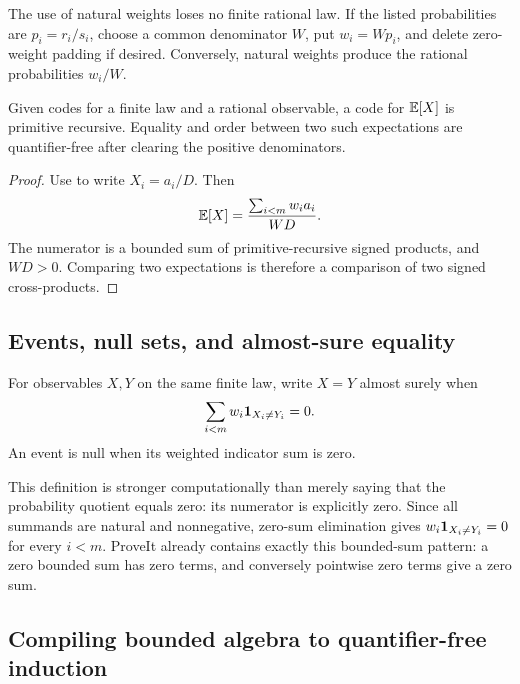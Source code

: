 The use of natural weights loses no finite rational law.  If the listed
probabilities are \(p_i=r_i/s_i\), choose a common denominator \(W\), put
\(w_i=Wp_i\), and delete zero-weight padding if desired.  Conversely, natural
weights produce the rational probabilities \(w_i/W\).

\begin{lemma}\label{lem:pr-evaluator}
Given codes for a finite law and a rational observable, a code for
\(\mathbb E[X]\) is primitive recursive.  Equality and order between two such
expectations are quantifier-free after clearing the positive denominators.
\end{lemma}

\begin{proof}
Use  to write \(X_i=a_i/D\).  Then
\[
 \mathbb E[X]=\frac{\sum_{i<m}w_i a_i}{WD}.
\]
The numerator is a bounded sum of primitive-recursive signed products, and
\(WD>0\).  Comparing two expectations is therefore a comparison of two signed
cross-products.
\end{proof}

\subsection{Events, null sets, and almost-sure equality}

\begin{definition}\label{def:ae}
For observables \(X,Y\) on the same finite law, write \(X=Y\) almost surely
when
\[
  \sum_{i<m} w_i\mathbf 1_{X_i\ne Y_i}=0.
\]
An event is null when its weighted indicator sum is zero.
\end{definition}

This definition is stronger computationally than merely saying that the
probability quotient equals zero: its numerator is explicitly zero.  Since all
summands are natural and nonnegative, zero-sum elimination gives
\(w_i\mathbf 1_{X_i\ne Y_i}=0\) for every \(i<m\).  ProveIt already contains exactly
this bounded-sum pattern: a zero bounded sum has zero terms, and conversely
pointwise zero terms give a zero sum.

\subsection{Compiling bounded algebra to quantifier-free induction}

